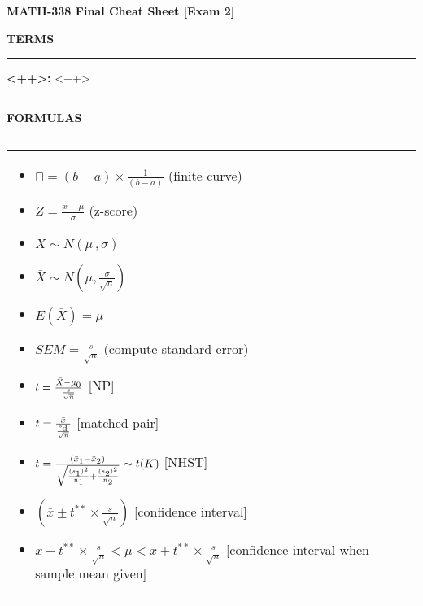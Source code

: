 \documentclass[6pt]{article}
\newcommand{\HL}{\par\noindent\rule{\textwidth}{0.4pt}}
\begin{document}
\begin{footnotesize}

\begin{center}
\textbf{MATH-338 Final Cheat Sheet [Exam 2]}
\end{center}

\textbf{TERMS}

\HL

\textbf{<++>:} <++>

\HL

\textbf{FORMULAS}

\HL

\begin{scriptsize}
\begin{tabular}{l | l}

\parbox{0.3\textwidth}{

\begin{itemize}
\setlength\itemsep{0.25em}
\item $\sqcap = (b-a) \times \frac{1}{(b-a)}$ (finite curve)
\item $Z = \frac{x - \mu}{\sigma}$ (z-score)
\item $X \sim N(\mu \, , \sigma)$
\item $\bar{X} \sim N(\mu, \frac{\sigma}{\sqrt{n}})$
\item $E(\bar{X}) = \mu$
\item $SEM = \frac{s}{\sqrt{n}}$ (compute standard error)
\item $t = \frac{\bar{X} - \mu\textsubscript{0}}{\frac{s}{\sqrt{n}}}$ [NP]

\item $t = \frac{\bar{x}}{\frac{s\textsubscript{d}}{\sqrt{n}}}$ [matched pair]

\item $t = \frac{(\bar{x}\textsubscript{1} - \bar{x}\textsubscript{2})}{\sqrt{\frac{(s\textsubscript{1})^2}{n\textsubscript{1}} +\frac{(s\textsubscript{2})^2}{n\textsubscript{2}}}} \sim t(K)$ [NHST]
\item $(\bar{x} \pm t^{\ast\ast} \times \frac{s}{\sqrt{n}})$ [confidence interval]
\item $\bar{x} - t^{\ast\ast} \times \frac{s}{\sqrt{n}} < \mu < \bar{x} + t^{\ast\ast} \times \frac{s}{\sqrt{n}}$ [confidence interval when sample mean given]
\end{itemize}

}

&


\end{tabular}
\end{scriptsize}
\end{footnotesize}
\end{document}
